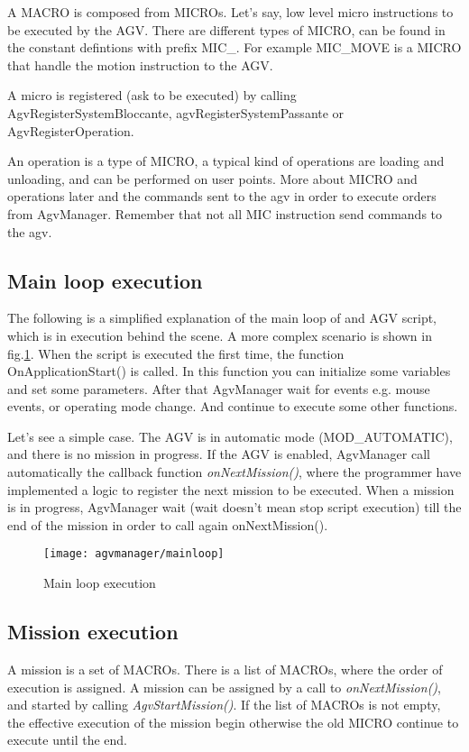 A MACRO is composed from MICROs. Let's say, low level micro instructions to be executed by the AGV. There are different types of MICRO, can be found in the constant defintions with prefix MIC\_. For example MIC\_MOVE is a MICRO that handle the motion instruction to the AGV.

A micro is registered (ask to be executed) by calling AgvRegisterSystemBloccante, agvRegisterSystemPassante or AgvRegisterOperation.

An operation is a type of MICRO, a typical kind of operations are loading and unloading, and can be performed on user points.
More about MICRO and operations later and the commands sent to the agv in order to execute orders from AgvManager. Remember that not all MIC instruction send commands to the agv. 

\subsection{Main loop execution}
The following is a simplified explanation of the main loop of and AGV script, which is in execution behind the scene. A more complex scenario is shown in fig.\ref{fig:mainLoop}.
When the script is executed the first time, the function OnApplicationStart() is called. In this function you can initialize some variables and set some parameters. After that AgvManager wait for events e.g. mouse events, or operating mode change. And continue to execute some other functions.

Let's see a simple case. The AGV is in automatic mode (MOD\_AUTOMATIC), and there is no mission in progress. If the AGV is enabled, AgvManager call automatically the callback function \textit{onNextMission()}, where the programmer have implemented a logic to register the next mission to be executed. When a mission is in progress, AgvManager wait (wait doesn't mean stop script execution) till the end of the mission in order to call again onNextMission().

\begin{figure}
	\centering\texttt{[image: agvmanager/mainloop]}
	\caption{Main loop execution}
	\label{fig:mainLoop}
\end{figure}

\subsection{Mission execution}
A mission is a set of MACROs. There is a list of MACROs, where the order of execution is assigned.
A mission can be assigned by a call to \textit{onNextMission()}, and started by calling \textit{AgvStartMission()}.
If the list of MACROs is not empty, the effective execution of the mission begin otherwise the old MICRO continue to execute until the end.

